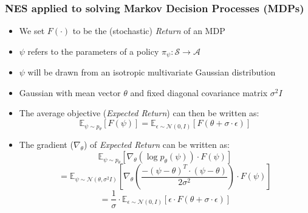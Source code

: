 \documentclass[handout]{beamer}
\begin{document}
\begin{frame}
\frametitle{NES applied to solving Markov Decision Processes (MDPs)}
\begin{itemize}
\item We set $F(\cdot)$ to be the (stochastic) {\em Return} of an MDP
\item $\psi$ refers to the parameters of a policy $\pi_{\psi} : \mathcal{S} \rightarrow \mathcal{A}$
\item $\psi$ will be drawn from an isotropic multivariate Gaussian distribution
\item Gaussian with mean vector $\theta$ and fixed diagonal covariance matrix $\sigma^2 I$
\item The average objective ({\em Expected Return}) can then be written as:
$$\mathbb{E}_{\psi \sim p_{\theta}}[F(\psi)] = \mathbb{E}_{\epsilon \sim \mathcal{N}(0,I)}[F(\theta + \sigma \cdot \epsilon)]$$
\item The gradient ($\nabla_{\theta}$) of {\em Expected Return} can be written as:
$$\mathbb{E}_{\psi \sim p_{\theta}}[\nabla_{\theta}(\log{p_{\theta}(\psi)}) \cdot F(\psi)]$$
$$ = \mathbb{E}_{\psi \sim \mathcal{N}(\theta,\sigma^2 I)}[\nabla_{\theta} ( \frac {-(\psi - \theta)^T \cdot (\psi - \theta)} {2\sigma^2}) \cdot F(\psi)]$$
$$=\frac 1 {\sigma} \cdot \mathbb{E}_{\epsilon \sim \mathcal{N}(0,I)}[\epsilon \cdot F(\theta + \sigma \cdot \epsilon)]$$
\end{itemize}
\end{frame}
\end{document}
